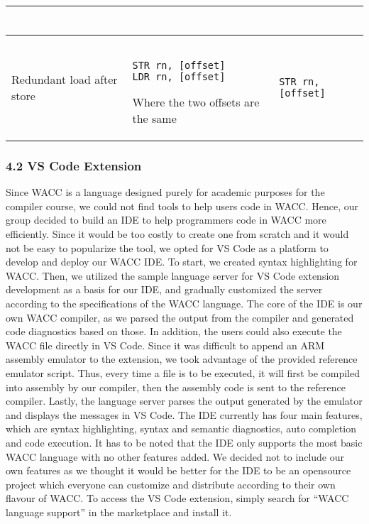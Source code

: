 \documentclass[10pt,a4paper]{report}
\newenvironment{tabularverbatim}
 {\VerbatimEnvironment
  \begin{BVerbatim}[baseline=c,formatcom=\setlength{\baselineskip}{\normalbaselineskip}]}
 {\end{BVerbatim}}
\begin{document}
\begin{center}
\begin{tabular}{| m{3cm} | m{4cm} | m{4cm} |}
\begin{tabularverbatim}
      \end{tabularverbatim}
      \\
      \hline
      Redundant load after store &
      \begin{tabularverbatim}

STR rn, [offset]
LDR rn, [offset]

      \end{tabularverbatim}
      \newline
      Where the two offsets are the same
      &
      \begin{tabularverbatim}
STR rn, [offset]
      \end{tabularverbatim}
      \\
      \hline
    \end{tabular}
  \end{center}


  \subsubsection*{4.2 VS Code Extension}
  Since WACC is a language designed purely for academic purposes for the
  compiler course, we could not find tools to help users code in WACC. Hence,
  our group decided to build an IDE to help programmers code in WACC more
  efficiently. Since it would be too costly to create one from scratch and it
  would not be easy to popularize the tool, we opted for VS Code as a platform 
  to develop and deploy our WACC IDE. To start, we created syntax highlighting
  for WACC. Then, we utilized the sample language server for VS Code extension
  development as a basis for our IDE, and gradually customized the server
  according to the specifications of the WACC language. The core of the IDE is
  our own WACC compiler, as we parsed the output from the compiler and generated
  code diagnostics based on those. In addition, the users could also execute the
  WACC file directly in VS Code. Since it was difficult to append an ARM
  assembly emulator to the extension, we took advantage of the provided
  reference emulator script. Thus, every time a file is to be executed, it will
  first be compiled into assembly by our compiler, then the assembly code is
  sent to the reference compiler. Lastly, the language server parses the output
  generated by the emulator and displays the messages in VS Code. The IDE
  currently has four main features, which are syntax highlighting, syntax and
  semantic diagnostics, auto completion and code execution. It has to be noted
  that the IDE only supports the most basic WACC language with no other features
  added. We decided not to include our own features as we thought it would be
  better for the IDE to be an opensource project which everyone can customize
  and distribute according to their own flavour of WACC. To access the VS Code
  extension, simply search for “WACC language support” in the marketplace and
  install it.
\end{document}
